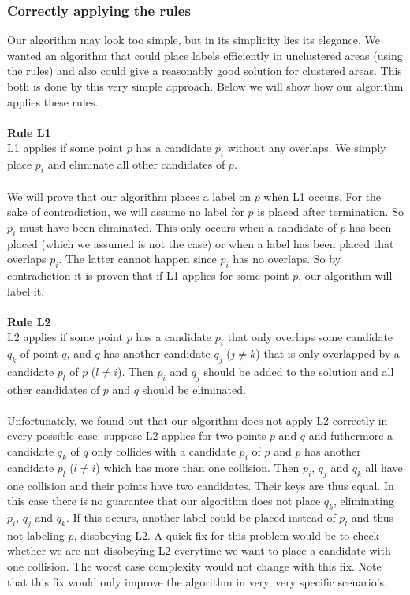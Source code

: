 \documentclass[crop=false,a4paper,oneside,11pt]{article}
\begin{document}
\subsubsection{Correctly applying the rules}
Our algorithm may look too simple, but in its simplicity lies its elegance. We wanted an algorithm that could place labels efficiently in unclustered areas (using the rules) and also could give a reasonably good solution for clustered areas. This both is done by this very simple approach. Below we will show how our algorithm applies these rules.\\
\\
\textbf{Rule L1}\\
L1 applies if some point $p$ has a candidate $p_i$ without any overlaps. We simply place $p_i$ and eliminate all other candidates of $p$.\\
\\
We will prove that our algorithm places a label on $p$ when L1 occurs. For the sake of contradiction, we will assume no label for $p$ is placed after termination. So $p_i$ must have been eliminated. This only occurs when a candidate of $p$ has been placed (which we assumed is not the case) or when a label has been placed that overlaps $p_i$. The latter cannot happen since $p_i$ has no overlaps. So by contradiction it is proven that if L1 applies for some point $p$, our algorithm will label it.\\
\\
\textbf{Rule L2}\\
L2 applies if some point $p$ has a candidate $p_i$ that only overlaps some candidate $q_k$ of point $q$, and $q$ has another
candidate $q_j$ ($j \neq k$) that is only overlapped by a candidate $p_l$ of $p$ ($l \neq i$). Then $p_i$
and $q_j$ should be added to the solution and all other candidates of $p$ and $q$ should be eliminated.\\
\\
Unfortunately, we found out that our algorithm does not apply L2 correctly in every possible case: suppose L2 applies for two points $p$ and $q$ and futhermore a candidate $q_k$ of $q$ only collides with a candidate $p_i$ of $p$ and $p$ has another candidate $p_l$ ($l\neq i$) which has more than one collision. Then $p_i$, $q_j$ and $q_k$ all have one collision and their points have two candidates. Their keys are thus equal. In this case there is no guarantee that our algorithm does not place $q_k$, eliminating $p_i$, $q_j$ and $q_k$. If this occurs, another label could be placed instead of $p_l$ and thus not labeling $p$, disobeying L2. A quick fix for this problem would be to check whether we are not disobeying L2 everytime we want to place a candidate with one collision. The worst case complexity would not change with this fix. Note that this fix would only improve the algorithm in very, very specific scenario's.\\
\end{document}

